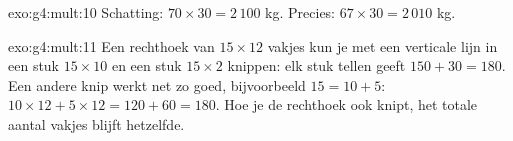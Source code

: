 \begin{solution}{exo:g4:mult:10}
Schatting: $70 \times 30 = 2\,100$ kg. Precies: $67 \times 30 = 2\,010$
kg.
\end{solution}

\begin{solution}{exo:g4:mult:11}
Een rechthoek van $15 \times 12$ vakjes kun je met een verticale lijn in
een stuk $15 \times 10$ en een stuk $15 \times 2$ knippen: elk stuk tellen
geeft $150 + 30 = 180$. Een andere knip werkt net zo goed, bijvoorbeeld
$15 = 10 + 5$: $10 \times 12 + 5 \times 12 = 120 + 60 = 180$. Hoe je de
rechthoek ook knipt, het totale aantal vakjes blijft hetzelfde.
\end{solution}
